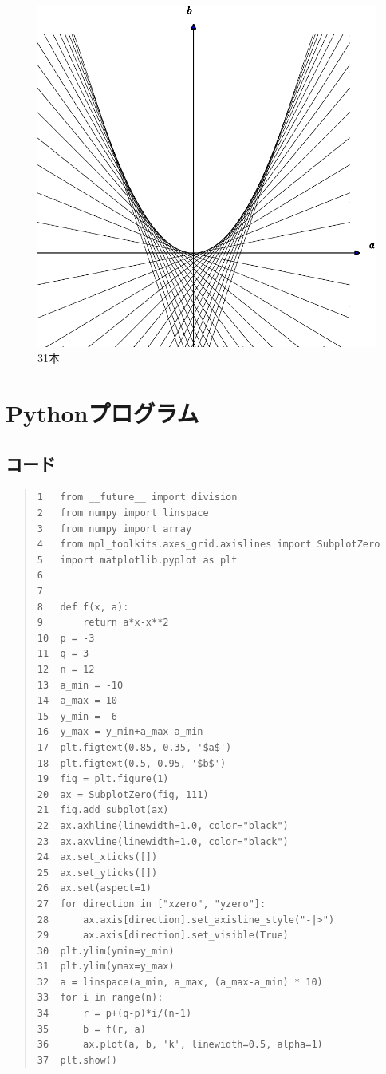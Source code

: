 \documentclass[11pt,a4j,fleqn]{jarticle}
\begin{document}
\begin{figure}[p]
 \centering
 \includegraphics[scale=0.7]{envelope1.pdf}
 \caption{31本}
 \label{fig:2}
\end{figure}



\newpage
\section{Pythonプログラム}
\subsection{コード}
\begin{quote}
\begin{verbatim}
1  	from __future__ import division
2  	from numpy import linspace
3  	from numpy import array
4  	from mpl_toolkits.axes_grid.axislines import SubplotZero
5  	import matplotlib.pyplot as plt
6  	
7  	
8  	def f(x, a):
9  	    return a*x-x**2
10 	p = -3
11 	q = 3
12 	n = 12
13 	a_min = -10
14 	a_max = 10
15 	y_min = -6
16 	y_max = y_min+a_max-a_min
17 	plt.figtext(0.85, 0.35, '$a$')
18 	plt.figtext(0.5, 0.95, '$b$')
19 	fig = plt.figure(1)
20 	ax = SubplotZero(fig, 111)
21 	fig.add_subplot(ax)
22 	ax.axhline(linewidth=1.0, color="black")
23 	ax.axvline(linewidth=1.0, color="black")
24 	ax.set_xticks([])
25 	ax.set_yticks([])
26 	ax.set(aspect=1)
27 	for direction in ["xzero", "yzero"]:
28 	    ax.axis[direction].set_axisline_style("-|>")
29 	    ax.axis[direction].set_visible(True)
30 	plt.ylim(ymin=y_min)
31 	plt.ylim(ymax=y_max)
32 	a = linspace(a_min, a_max, (a_max-a_min) * 10)
33 	for i in range(n):
34 	    r = p+(q-p)*i/(n-1)
35 	    b = f(r, a)
36 	    ax.plot(a, b, 'k', linewidth=0.5, alpha=1)
37 	plt.show()
\end{verbatim}
\end{quote}
\end{document}
